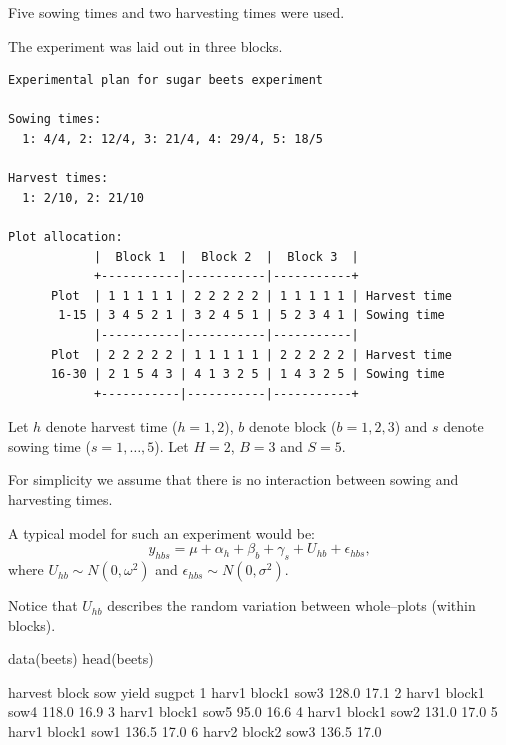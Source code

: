 \documentclass[12pt]{article}
\begin{document}
  Five sowing times and two  harvesting times were used.

  The experiment was laid out in three blocks.

{\small
\begin{verbatim}
Experimental plan for sugar beets experiment

Sowing times:
  1: 4/4, 2: 12/4, 3: 21/4, 4: 29/4, 5: 18/5

Harvest times:
  1: 2/10, 2: 21/10

Plot allocation:
            |  Block 1  |  Block 2  |  Block 3  |
            +-----------|-----------|-----------+
      Plot  | 1 1 1 1 1 | 2 2 2 2 2 | 1 1 1 1 1 | Harvest time
       1-15 | 3 4 5 2 1 | 3 2 4 5 1 | 5 2 3 4 1 | Sowing time
            |-----------|-----------|-----------|
      Plot  | 2 2 2 2 2 | 1 1 1 1 1 | 2 2 2 2 2 | Harvest time
      16-30 | 2 1 5 4 3 | 4 1 3 2 5 | 1 4 3 2 5 | Sowing time
            +-----------|-----------|-----------+
\end{verbatim}
}

Let $h$ denote harvest time ($h=1,2$), $b$ denote block
($b=1,2,3$) and $s$ denote sowing time ($s=1,\dots,5$). Let $H=2$,
$B=3$ and $S=5$.

For simplicity we assume that there is no interaction between sowing
and harvesting times.

A typical model for such an experiment would be:
\begin{equation}
  \label{eq:beetsmodel1}
  y_{hbs} = \mu + \alpha_h + \beta_b + \gamma_s + U_{hb} + \epsilon_{hbs},
\end{equation}
where $U_{hb} \sim N(0,\omega^2)$ and $\epsilon_{hbs}\sim
N(0,\sigma^2)$.

Notice that $U_{hb}$ describes the random variation
between whole--plots (within blocks).




\begin{Schunk}
\begin{Sinput}
 data(beets)
 head(beets)
\end{Sinput}
\begin{Soutput}
  harvest  block  sow yield sugpct
1   harv1 block1 sow3 128.0   17.1
2   harv1 block1 sow4 118.0   16.9
3   harv1 block1 sow5  95.0   16.6
4   harv1 block1 sow2 131.0   17.0
5   harv1 block1 sow1 136.5   17.0
6   harv2 block2 sow3 136.5   17.0
\end{Soutput}
\end{Schunk}
\end{document}
